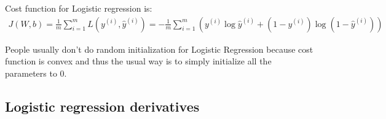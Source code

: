 \documentclass[a4paper]{report}
\begin{document}
Cost function for Logistic regression is:
\begin{align}
J(W, b) = \frac{1}{m}\sum_{i = 1}^{m}L(y^{(i)}, \hat{y}^{(i)}) = -\frac{1}{m}\sum_{i = 1}^{m}(y^{(i)}\log{\hat{y}^{(i)}} + (1 - y^{(i)})\log{(1 - \hat{y}^{(i)})})
\end{align}

People usually don't do random initialization for Logistic Regression because cost function is convex and thus the usual way is to simply initialize all the parameters to $0$.

\subsection{Logistic regression derivatives}
\end{document}

